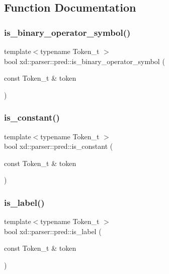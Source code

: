 \subsection{Function Documentation}
\mbox{\label{namespacexd_1_1parser_1_1pred_a4f406be2c42ccba4d6c237785b5c063c}} 
\subsubsection{\texorpdfstring{is\+\_\+binary\+\_\+operator\+\_\+symbol()}{is\_binary\_operator\_symbol()}}
{\footnotesize\ttfamily template$<$typename Token\+\_\+t $>$ \\
bool xd\+::parser\+::pred\+::is\+\_\+binary\+\_\+operator\+\_\+symbol (\begin{DoxyParamCaption}\item[{const Token\+\_\+t \&}]{token }\end{DoxyParamCaption})}

\mbox{\label{namespacexd_1_1parser_1_1pred_abee53e1f056107ec126152aab7a24827}} 
\subsubsection{\texorpdfstring{is\+\_\+constant()}{is\_constant()}}
{\footnotesize\ttfamily template$<$typename Token\+\_\+t $>$ \\
bool xd\+::parser\+::pred\+::is\+\_\+constant (\begin{DoxyParamCaption}\item[{const Token\+\_\+t \&}]{token }\end{DoxyParamCaption})}

\mbox{\label{namespacexd_1_1parser_1_1pred_a2bf54f011a9ef2dbcfffb13dc3682690}} 
\subsubsection{\texorpdfstring{is\+\_\+label()}{is\_label()}}
{\footnotesize\ttfamily template$<$typename Token\+\_\+t $>$ \\
bool xd\+::parser\+::pred\+::is\+\_\+label (\begin{DoxyParamCaption}\item[{const Token\+\_\+t \&}]{token }\end{DoxyParamCaption})}

